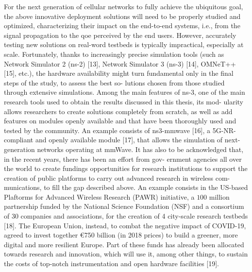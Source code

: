 For the next generation of cellular networks to fully achieve the ubiquitous goal, the above innovative deployment solutions will need to be properly studied and optimized, characterizing their impact on the end-to-end systems, i.e., from the signal propagation to the \gls{qoe} perceived by the end users.
However, accurately testing new solutions on real-word testbeds is typically impractical, especially at scale. 
Fortunately, thanks to increasingly precise simulation tools (such as Network
Simulator 2 (ns-2) [13], Network Simulator 3 (ns-3) [14], OMNeT++ [15], etc.), the hardware
availability might turn fundamental only in the final steps of the study, to assess the best so-
lutions chosen from those studied through extensive simulations. Among the main features of
ns-3, one of the main research tools used to obtain the results discussed in this thesis, its mod-
ularity allows researchers to create solutions completely from scratch, as well as add features
on modules openly available and that have been thoroughly used and tested by the community.
An example consists of ns3-mmwave [16], a 5G-NR-compliant and openly available module [17],
that allows the simulation of next-generation networks operating at mmWave.
It has also to be acknowledged that, in the recent years, there has been an effort from gov-
ernment agencies all over the world to create fundings opportunities for research institutions
to support the creation of public platforms to carry out advanced research in wireless com-
munications, to fill the gap described above. An example consists in the US-based Plaftorms
for Advanced Wireless Research (PAWR) initiative, a $100$ million partnership funded by the
National Science Foundation (NSF) and a consortium of 30 companies and associations, for the
creation of 4 city-scale research testbeds [18]. The European Union, instead, to combat the
negative impact of COVID-19, agreed to invest together €750 billion (in 2018 prices) to build a
greener, more digital and more resilient Europe. Part of these funds has already been allocated
towards research and innovation, which will use it, among other things, to sustain the costs of
top-notch instrumentation and open hardware facilities [19].

